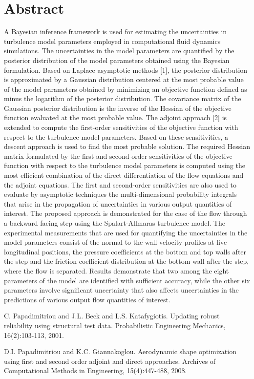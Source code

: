 \documentclass[article, A4, 11pt]{llncs}%
\begin{document}
\section*{Abstract}
A Bayesian inference framework is used for estimating the uncertainties in turbulence model parameters employed in computational fluid dynamics simulations. The uncertainties in the model parameters are quantified by the posterior distribution of the model parameters obtained using the Bayesian formulation. Based on Laplace asymptotic methods [1], the posterior distribution is approximated by a Gaussian distribution centered at the most probable value of the model parameters obtained by minimizing an objective function defined as minus the logarithm of the posterior distribution. The covariance matrix of the Gaussian posterior distribution is the inverse of the Hessian of the objective function evaluated at the most probable value. The adjoint approach [2] is extended to compute the first-order sensitivities of the objective function with respect to the turbulence model parameters. Based on these sensitivities, a descent approach is used to find the most probable solution. The required Hessian matrix formulated by the first and second-order sensitivities of the objective function with respect to the turbulence model parameters is computed using the most efficient combination of the direct differentiation of the flow equations and the adjoint equations. The first and second-order sensitivities are also used to evaluate by asymptotic techniques the multi-dimensional probability integrals that arise in the propagation of uncertainties in various output quantities of interest. The proposed approach is demonstrated for the case of the flow through a backward facing step using the Spalart-Allmaras turbulence model. The experimental measurements that are used for quantifying the uncertainties in the model parameters consist of the normal to the wall velocity profiles at five longitudinal positions, the pressure coefficients at the bottom and top walls after the step and the friction coefficient distribution at the bottom wall after the step, where the flow is separated. Results demonstrate that two among the eight parameters of the model are identified with sufficient accuracy, while the other six parameters involve significant uncertainty that also affects uncertainties in the predictions of various output flow quantities of interest.


\begin{thebibliography}{10}
{\sc C. Papadimitriou and J.L. Beck and L.S. Katafygiotis}. {Updating robust reliability using structural test data}. Probabilistic Engineering Mechanics, 16(2):103-113, 2001.

{\sc D.I. Papadimitriou and K.C. Giannakoglou}. {Aerodynamic shape optimization using first and second order adjoint and direct approaches}. Archives of Computational Methods in Engineering, 15(4):447-488, 2008.
\end{thebibliography} %
\end{document}
